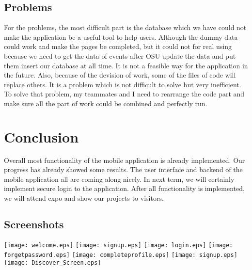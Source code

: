 \documentclass[letterpaper, 10pt,titlepage]{article}
\begin{document}
\subsection{Problems}
For the problems, the most difficult part is the database which we have could not make the application be a useful tool to help users. Although the dummy data could work and make the pages be completed, but it could not for real using because we need to get the data of events after OSU update the data and put them insert our database at all time. It is not a feasible way for the application in the future. Also, because of the devision of work, some of the files of code will replace others. It is a problem which is not difficult to solve but very inefficient. To solve that problem, my teammates and I need to rearrange the code part and make sure all the part of work could be combined and perfectly run.

\section{Conclusion}
Overall most functionality of the mobile application is already implemented. Our progress has already showed some results. The user interface and backend of the mobile application all are coming along nicely. In next term, we will certainly implement secure login to the application. After all functionality is implemented, we will attend expo and show our projects to visitors.\\

\subsection{Screenshots}
\newpage
\texttt{[image: welcome.eps]}
\newpage
\texttt{[image: signup.eps]}
\newpage
\texttt{[image: login.eps]}
\newpage
\texttt{[image: forgetpassword.eps]}
\newpage
\texttt{[image: completeprofile.eps]}
\newpage
\texttt{[image: signup.eps]}
\newpage
\newpage
\texttt{[image: Discover\_Screen.eps]}
\end{document}
